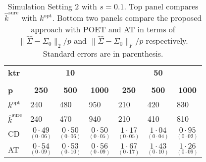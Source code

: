\documentclass[11pt,oneside]{amsart}
\begin{document}
\begin{table}[htbp!]
\footnotesize
\caption{Simulation Setting 2 with $s = 0.1$. Top panel compares $\widehat{k}^{\text{sure}}$ with $k^{\text{opt}}$. Bottom two panels compare the proposed approach with POET and AT in terms of $\|{\widehat{\Sigma}} - {\Sigma_0}\|_{2}/p$ and $\|{\widehat{\Sigma}} - {\Sigma_0}\|_{F}/p$ respectively. Standard errors are in parenthesis.} \label{table4} 
\begin{multicols}{7}
\centering
\begin{tabular}{|p{1.92cm}|p{1.92cm}|p{1.92cm}|p{1.92cm}|p{1.92cm}|p{1.92cm}|p{1.92cm}|} \toprule
{\bf ktr} & \multicolumn{3}{c}{{\bf{10}}}& \multicolumn{3}{c|}{{\bf{50}}} \\
\cmidrule(lr){2-4} \cmidrule(lr){5-7} \\
{\bf p} & \multicolumn{1}{c}{{\bf 250}} & \multicolumn{1}{c}{{\bf 500}} & \multicolumn{1}{c}{{\bf 1000}} & \multicolumn{1}{c}{{\bf 250}} & \multicolumn{1}{c}{{\bf 500}} & \multicolumn{1}{c|}{{\bf 1000}}\\
\hline
${k^{\text{opt}}}$ & 240 & 480 & 950 & 210 & 420 & 830 \\  
${\widehat{k}}^{\text{sure}}$ & 240 & 470 & 940 & 210 & 410 & 810 \\  \hline \hline 
CD & ${\underset{(0\cdot06)}{0\cdot49}}$ & ${\underset{(0\cdot06)}{0\cdot50}}$ & ${\underset{(0\cdot05)}{0\cdot50}}$ & ${\underset{(0\cdot05)}{1\cdot17}}$ & ${\underset{(0\cdot04)}{1\cdot04}}$ & ${\underset{(0\cdot02)}{0\cdot95}}$ \\  
AT & ${\underset{(0\cdot09)}{0\cdot54}}$ & ${\underset{(0\cdot10)}{0\cdot53}}$ & ${\underset{(0\cdot09)}{0\cdot56}}$ & ${\underset{(0\cdot17)}{1\cdot67}}$ & ${\underset{(0\cdot10)}{1\cdot43}}$ & ${\underset{(0\cdot09)}{1\cdot26}}$ \\ 

\end{tabular}
\end{multicols}
\end{table}
\end{document}
